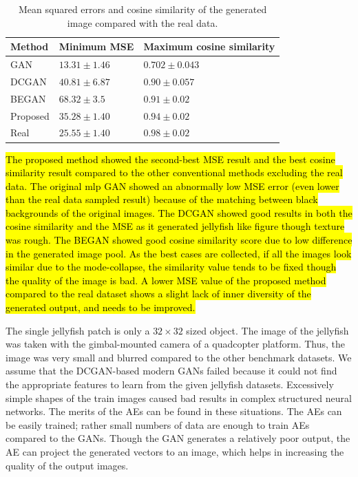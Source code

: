 \documentclass{ieeeaccess}
\begin{document}
\begin{table}
\caption{Mean squared errors and cosine similarity of the generated image compared with the real data.}
\label{table}
\setlength{\tabcolsep}{3pt}
\begin{tabular}{|p{30pt}|p{75pt}|p{115pt}|}
\hline
Method& 
Minimum MSE& 
Maximum cosine similarity \\
\hline
GAN & 
$13.31 \pm 1.46$& 
$0.702 \pm 0.043$ \\
DCGAN& 
$40.81 \pm 6.87$& 
$0.90 \pm 0.057$ \\
BEGAN& 
$68.32 \pm 3.5$& 
$0.91 \pm 0.02$ \\
Proposed& 
$35.28 \pm 1.40$& 
$0.94 \pm 0.02$ \\
Real& 
$25.55 \pm 1.40$& 
$0.98 \pm 0.02$ \\

\hline

\end{tabular}
\label{tab1}
\end{table}

\hl{The proposed method showed the second-best MSE result and the best cosine similarity result compared to the other conventional methods excluding the real data. The original mlp GAN showed an abnormally low MSE error (even lower than the real data sampled result) because of the matching between black backgrounds of the original images. The DCGAN showed good results in both the cosine similarity and the MSE as it generated jellyfish like figure though texture was rough. The BEGAN showed good cosine similarity score due to low difference in the generated image pool. As the best cases are collected, if all the images look similar due to the mode-collapse, the similarity value tends to be fixed though the quality of the image is bad. A lower MSE value of the proposed method compared to the real dataset shows a slight lack of inner diversity of the generated output, and needs to be improved.}

The single jellyfish patch is only a $32 \times 32$ sized object. The image of the jellyfish was taken with the gimbal-mounted camera of a quadcopter platform. Thus, the image was very small and blurred compared to the other benchmark datasets. We assume that the DCGAN-based modern GANs failed because it could not find the appropriate features to learn from the given jellyfish datasets. Excessively simple shapes of the train images caused bad results in complex structured neural networks. The merits of the AEs can be found in these situations. The AEs can be easily trained; rather small numbers of data are enough to train AEs compared to the GANs. Though the GAN generates a relatively poor output, the AE can project the generated vectors to an image, which helps in increasing the quality of the output images.
\end{document}
